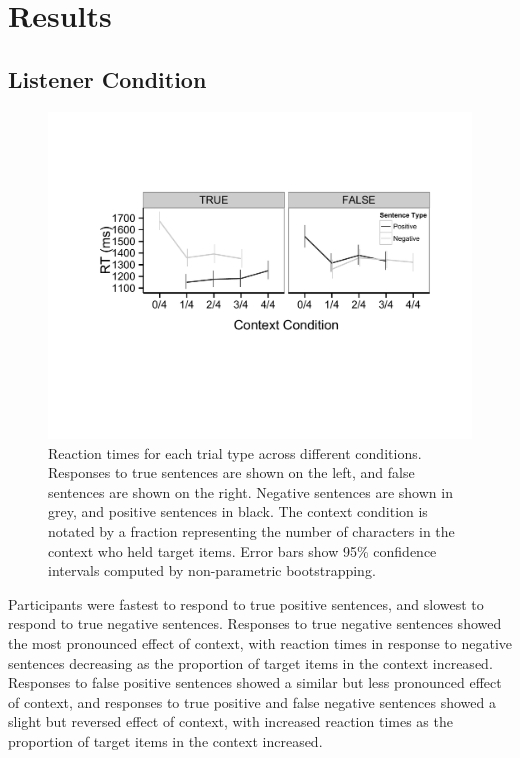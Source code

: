 \documentclass[man, noapacite]{apa2}
\begin{document}
\section{Results}

\subsection{Listener Condition}

\begin{figure}[t]
\begin{center} 
\includegraphics[width=6in]{figures/rts.pdf}
\caption{\label{fig:e2line} Reaction times for each trial type across different conditions. Responses to true sentences are shown on the left, and false sentences are shown on the right.  Negative sentences are shown in grey, and positive sentences in black.  The context condition is notated by a fraction representing the number of characters in the context who held target items. Error bars show 95\% confidence intervals computed by non-parametric bootstrapping.  }
\end{center} 
\end{figure}

Participants were fastest to respond to true positive sentences, and slowest to respond to true negative sentences.  Responses to true negative sentences showed the most pronounced effect of context, with reaction times in response to negative sentences decreasing as the proportion of target items in the context increased.  Responses to false positive sentences showed a similar but less pronounced effect of context, and responses to true positive and false negative sentences showed a slight but reversed effect of context, with increased reaction times as the proportion of target items in the context increased.  
\end{document}

